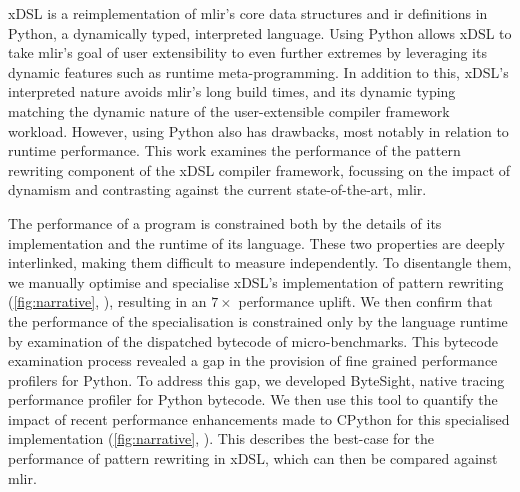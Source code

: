 
xDSL \cite{fehrXDSLSidekickCompilation2025} is a reimplementation of \ac{mlir}'s core data structures and \ac{ir} definitions in Python, a dynamically typed, interpreted language.
Using Python allows xDSL to take \ac{mlir}'s goal of user extensibility to even further extremes by leveraging its dynamic features such as runtime meta-programming.
In addition to this, xDSL's interpreted nature avoids \ac{mlir}'s long build times, and its dynamic typing matching the dynamic nature of the user-extensible compiler framework workload.
However, using Python also has drawbacks, most notably in relation to runtime performance.
This work examines the performance of the pattern rewriting component of the xDSL compiler framework, focussing on the impact of dynamism and contrasting against the current state-of-the-art, \ac{mlir}.




The performance of a program is constrained both by the details of its implementation and the runtime of its language.
These two properties are deeply interlinked, making them difficult to measure independently.
To disentangle them, we manually optimise and specialise xDSL's implementation of pattern rewriting (\autoref{fig:narrative}, ), resulting in an $7\times$ performance uplift.
We then confirm that the performance of the specialisation is constrained only by the language runtime by examination of the dispatched bytecode of micro-benchmarks.
This bytecode examination process revealed a gap in the provision of fine grained performance profilers for Python. To address this gap, we developed ByteSight, native tracing performance profiler for Python bytecode.
We then use this tool to quantify the impact of recent performance enhancements made to CPython for this specialised implementation (\autoref{fig:narrative}, ).
This describes the best-case for the performance of pattern rewriting in xDSL, which can then be compared against \ac{mlir}.

